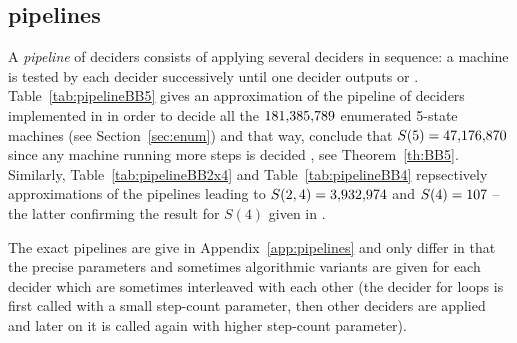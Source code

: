 \subsection{\CoqBB pipelines}\label{sec:pipelines}
A \textit{pipeline} of deciders consists of applying several deciders in sequence: a machine is tested by each decider successively until one decider outputs \HALT or \NONHALT. Table~\ref{tab:pipelineBB5} gives an approximation of the pipeline of deciders implemented in \CoqBB in order to decide all the $181{,}385{,}789$ enumerated 5-state machines (see Section~\ref{sec:enum}) and that way, conclude that $S(5) = 47{,}176{,}870$ since any machine running more steps is decided \NONHALT, see Theorem~\ref{th:BB5}. Similarly, Table~\ref{tab:pipelineBB2x4} and Table~\ref{tab:pipelineBB4} repsectively approximations of the pipelines leading to $S(2,4) = 3{,}932{,}974$ and $S(4) = 107$ -- the latter confirming the result for $S(4)$ given in \cite{Brady83}.

The exact pipelines are give in Appendix~\ref{app:pipelines} and only differ in that the precise parameters and sometimes algorithmic variants are given for each decider which are sometimes interleaved with each other (\eg the decider for loops is first called with a small step-count parameter, then other deciders are applied and later on it is called again with higher step-count parameter).


